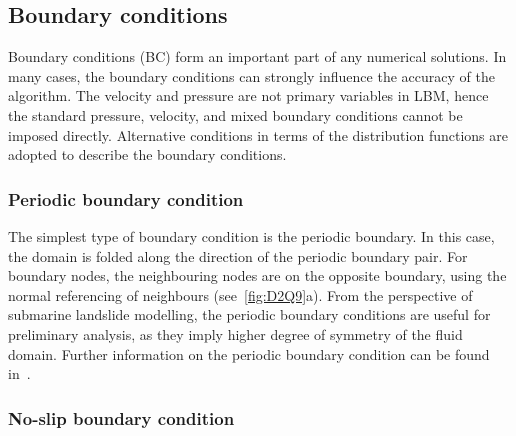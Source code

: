 
\subsection{Boundary conditions}

Boundary conditions (BC) form an important part of any 
numerical solutions. In many cases, the boundary conditions can 
strongly influence the accuracy of the algorithm. The velocity 
and pressure are not primary variables in LBM, hence the 
standard pressure, velocity, and mixed boundary conditions 
cannot be imposed directly. Alternative conditions in terms of 
the distribution functions are adopted to describe the boundary 
conditions.

\subsubsection*{Periodic boundary condition}

The simplest type of boundary condition is the periodic 
boundary. In this case, the domain is folded along the 
direction of the periodic boundary pair. For boundary nodes, 
the neighbouring nodes are on the opposite boundary, using the 
normal referencing of neighbours (see~\cref{fig:D2Q9}a). From 
the perspective of submarine landslide modelling, the periodic 
boundary conditions are useful for preliminary analysis, as 
they imply higher degree of symmetry of the fluid domain. 
Further information on the periodic boundary condition can be 
found in~\citet{Aidun1998}.

\subsubsection*{No-slip boundary condition} \label{bounce}

